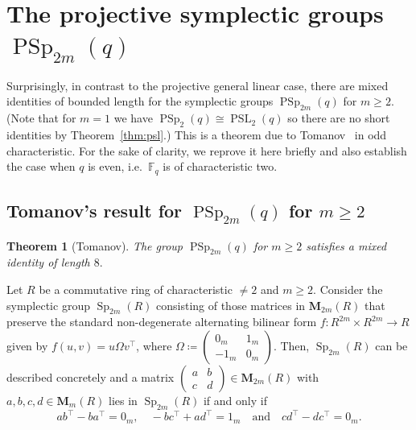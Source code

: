 \documentclass[a4paper,11pt]{amsproc}
\newcommand{\finfield}{\mathbb{F}}%
\newcommand{\M}{\mathbf{M}}%
\DeclareMathOperator{\Sp}{Sp}%
\DeclareMathOperator{\PSp}{PSp}%
\DeclareMathOperator{\PSL}{PSL}%
\theoremstyle{plain}
\newtheorem{theorem}{Theorem}
\theoremstyle{definition}
\begin{document}
	\section{The projective symplectic groups \texorpdfstring{$\PSp_{2m}(q)$}{PSp2mq}} \label{SympSect}
	
	Surprisingly, in contrast to the projective general linear case, there are mixed identities of bounded length for the symplectic groups $\PSp_{2m}(q)$ for $m\geq 2$. (Note that for $m=1$ we have $\PSp_2(q)\cong\PSL_2(q)$ so there are no short identities by Theorem~\ref{thm:psl}.) This is a theorem due to Tomanov~\cite{tomanov1985generalized} in odd characteristic. For the sake of clarity, we reprove it here briefly and also establish the case when $q$ is even, i.e.\ $\finfield_q$ is of characteristic two.
	
	\subsection{Tomanov's result for $\PSp_{2m}(q)$ for $m\geq 2$}
	
	\begin{theorem}[Tomanov] The group $\PSp_{2m}(q)$ for $m\geq 2$ satisfies a mixed identity of length $8.$
	\end{theorem}
	
	Let $R$ be a commutative ring of characteristic $\neq 2$ and $m\geq 2$. Consider the symplectic group $\Sp_{2m}(R)$ consisting of those matrices in $\M_{2m}(R)$ that preserve the standard non-degenerate alternating bilinear form $f\colon R^{2m}\times R^{2m}\to R$ given by
	$f(u,v)=u\Omega v^\top$,
	where $\Omega\coloneqq\left(\begin{smallmatrix}
		0_m & 1_m \\ -1_m & 0_m
	\end{smallmatrix} \right)$.
	Then, $\Sp_{2m}(R)$ can be described concretely and a matrix $\left(\begin{smallmatrix}
		a & b \\ c & d
	\end{smallmatrix} \right)\in\M_{2m}(R)$ with $a,b,c,d \in\M_m(R)$ lies in $\Sp_{2m}(R)$ if and only if 
	$$
	a b^\top-b a^\top=0_m, \quad -b c^\top+a d^\top=1_m \quad \mbox{and} \quad c d^\top-d c^\top=0_m.
	$$
	
\end{document}
